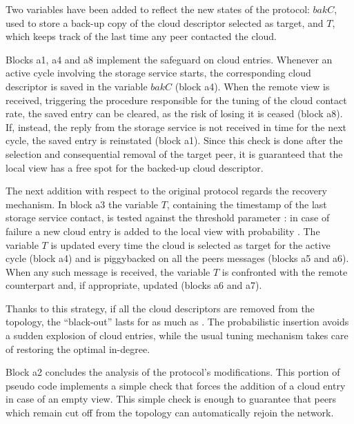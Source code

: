 Two variables have been added to reflect the new states of the protocol:
$bakC$, used to store a back-up copy of the cloud descriptor selected
as target, and $T$, which keeps track of the last time any peer
contacted the cloud.

Blocks a1, a4 and a8 implement the safeguard on
cloud entries. Whenever an active cycle involving the storage
service starts, the corresponding cloud descriptor is saved in the
variable $bakC$ (block a4). When the remote view is received,
triggering the procedure responsible for the tuning of the
cloud contact rate, the saved entry can be cleared, as the risk of
losing it is ceased (block a8). If, instead, the reply from the storage
service is not received in time for the next cycle, the saved entry is
reinstated (block a1). Since this check is done after the selection and
consequential removal of the target peer, it is guaranteed that the local
view has a free spot for the backed-up cloud descriptor.

The next addition with respect to the original protocol regards the
recovery mechanism. In block a3 the variable $T$, containing the
timestamp of the last storage service contact, is tested against the
threshold parameter \maxsilence: in case of failure a new
cloud entry is added to the local view with probability
\spawnprob. The variable $T$ is updated every time the
cloud is selected as target for the active cycle (block a4) and is
piggybacked on all the peers messages (blocks a5 and a6). When any
such message is received, the variable $T$ is confronted with the
remote counterpart and, if appropriate, updated (blocks a6 and a7).

Thanks to this strategy, if all the cloud descriptors are removed
from the topology, the ``black-out'' lasts for as much as
\maxsilence. The probabilistic insertion avoids a sudden explosion of
cloud entries, while the usual tuning mechanism takes care of
restoring the optimal in-degree.

Block a2 concludes the analysis of the protocol's modifications. This
portion of pseudo code implements a simple check that forces the
addition of a cloud entry in case of an empty view. This simple
check is enough to guarantee that peers which remain cut off from the
topology can automatically rejoin the network.
